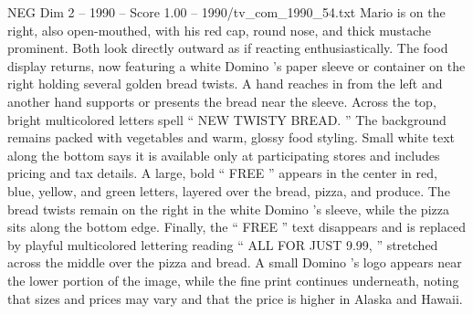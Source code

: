 \begin{textsample}{NEG Dim 2 – 1990 – Score 1.00 – 1990/tv\_com\_1990\_54.txt}
Mario is on the right, also open-mouthed, with his red cap, round nose, and thick mustache prominent.
Both look directly outward as if reacting enthusiastically.
The food display returns, now featuring a white Domino ’s paper sleeve or container on the right holding several golden bread twists.
A hand reaches in from the left and another hand supports or presents the bread near the sleeve.
Across the top, bright multicolored letters spell “ NEW TWISTY BREAD. ” The background remains packed with vegetables and warm, glossy food styling.
Small white text along the bottom says it is available only at participating stores and includes pricing and tax details.
A large, bold “ FREE ” appears in the center in red, blue, yellow, and green letters, layered over the bread, pizza, and produce.
The bread twists remain on the right in the white Domino ’s sleeve, while the pizza sits along the bottom edge.
Finally, the “ FREE ” text disappears and is replaced by playful multicolored lettering reading “ ALL FOR JUST 9.99, ” stretched across the middle over the pizza and bread.
A small Domino ’s logo appears near the lower portion of the image, while the fine print continues underneath, noting that sizes and prices may vary and that the price is higher in Alaska and Hawaii.

\end{textsample}
